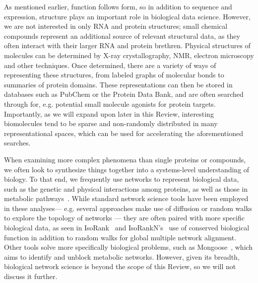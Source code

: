 \documentclass{acm_proc_article-sp}
\begin{document}
As mentioned earlier, function follows form, so in addition to
sequence and expression, structure plays an important role in biological data science.
However, we are not interested in only RNA and protein structures;
small chemical compounds represent an additional source of relevant structural data,
as they often interact with their larger RNA and protein brethren.
Physical structures of molecules can be determined by X-ray crystallography, NMR, electron microscopy and other 
techniques.
Once determined, there are a variety of ways of representing these structures, from labeled graphs of molecular bonds to summaries of protein domains.
These representations can then be stored in databases such as PubChem or the Protein Data Bank,
and are often searched through for, e.g. potential small molecule agonists for protein targets.
Importantly, as we will expand upon later in this Review, interesting biomolecules tend to be sparse and non-randomly distributed in many representational spaces, which can be used for accelerating the aforementioned searches.

When examining more complex phenomena than single proteins or compounds, we
often look to synthesize things together into a systems-level understanding of biology.
To that end, we frequently use
networks to represent biological data, such as the genetic
and physical interactions among proteins, as well as those in metabolic 
pathways~\cite{berger2013computational}.
While standard network science tools have been employed in these analyses---
e.g. several approaches make use of diffusion or random walks to explore the topology of networks \cite{cao2013going,cho2015diffusion}---
they are often paired with more specific biological data,
as seen in IsoRank~\cite{singh2008global} and IsoRankN's~\cite{liao2009isorankn} use of conserved biological function in addition to random walks for global multiple network alignment.
Other tools solve more specifically biological problems, such as Mongoose~\cite{chindelevitch2014exact}, which 
aims to identify and unblock metabolic networks.
However, given its breadth, biological network science is beyond the scope of this Review, so we will not discuss it further.

\end{document}
